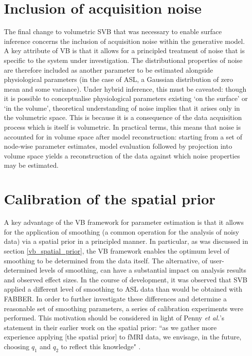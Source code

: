 \section{Inclusion of acquisition noise}

The final change to volumetric SVB that was necessary to enable surface inference concerns the inclusion of acquisition noise within the generative model. A key attribute of VB is that it allows for a principled treatment of noise that is specific to the system under investigation. The distributional properties of noise are therefore included as another parameter to be estimated alongside physiological parameters (in the case of ASL, a Gaussian distribution of zero mean and some variance). Under hybrid inference, this must be caveated: though it is possible to conceptualise physiological parameters existing `on the surface' or `in the volume', theoretical understanding of noise implies that it arises only in the volumetric space. This is because it is a consequence of the data acquisition process which is itself is volumetric. In practical terms, this means that noise is accounted for in volume space after model reconstruction: starting from a set of node-wise parameter estimates, model evaluation followed by projection into volume space yields a reconstruction of the data against which noise properties may be estimated. 

\section{Calibration of the spatial prior}
\label{prior_calibration}

A key advantage of the VB framework for parameter estimation is that it allows for the application of smoothing (a common operation for the analysis of noisy data) via a spatial prior in a principled manner. In particular, as was discussed in section \ref{vb_spatial_prior}, the VB framework enables the optimum level of smoothing to be determined from the data itself. The alternative, of user-determined levels of smoothing, can have a substantial impact on analysis results and observed effect sizes. In the course of development, it was observed that SVB applied a different level of smoothing to ASL data than would be obtained with FABBER. In order to further investigate these differences and determine a reasonable set of smoothing parameters, a series of calibration experiments were performed. This motivation should be considered in light of Penny \textit{et al.}'s statement in their earlier work on the spatial prior: ``as we gather more experience applying [the spatial prior] to fMRI data, we envisage, in the future, choosing $q_1$ and $q_2$ to reflect this knowledge" \cite{Penny2005}. 

